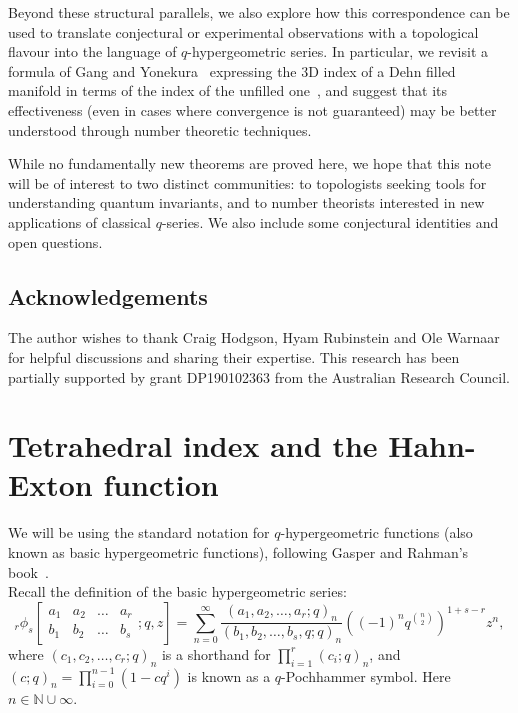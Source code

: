 \documentclass[11pt]{amsart}
\newcommand{\N}{\mathbb{N}}
\begin{document}
Beyond these structural parallels, we also explore how this correspondence can be used to translate conjectural or experimental observations with a topological flavour into the language of $q$-hypergeometric series. In particular, we revisit a formula of Gang and Yonekura~\cite{gang2018symmetry} expressing the $3$D index of a Dehn filled manifold in terms of the index of the unfilled one~\cite{3dindexdehn}, and suggest that its effectiveness (even in cases where convergence is not guaranteed) may be better understood through number theoretic techniques.

While no fundamentally new theorems are proved here, we hope that this note will be of interest to two distinct communities: to topologists seeking tools for understanding quantum invariants, and to number theorists interested in new applications of classical $q$-series. We also include some conjectural identities and open questions.

\subsection{Acknowledgements} The author wishes to thank Craig Hodgson, Hyam Rubinstein and Ole Warnaar for helpful discussions and sharing their expertise. This research has been partially supported by grant DP190102363 from the Australian
Research Council.

\section{Tetrahedral index and the Hahn-Exton function}


We will be using the standard notation for $q$-hypergeometric functions (also known as basic hypergeometric functions), following Gasper and Rahman's book~\cite{GasperRahman}.\\

Recall the definition of the basic hypergeometric series:
\begin{equation}
_{r}\phi_s \left[\begin{matrix}
a_1 & a_2 & \ldots & a_{r} \\
b_1 & b_2 & \ldots & b_{s} \end{matrix}
; q,z \right] = \sum_{n=0}^\infty
\frac {\left(a_1, a_2, \ldots, a_{r};q\right)_n} {\left(b_1, b_2, \ldots, b_s,q;q\right)_n} \left( \left(-1\right)^n q^{\binom{n}{2} }  \right)^{1+s-r}z^n,
\end{equation}
where $\left(c_1, c_2, \ldots, c_{r};q\right)_n$ is a shorthand for $\prod_{i = 1}^{r} \left(c_i;q\right)_n$, and $\left(c;q\right)_n = \prod_{i=0}^{n-1} \left(1-c  q^i\right)$ is known as a $q$-Pochhammer symbol. Here $n \in \N \cup \infty$.
\end{document}
